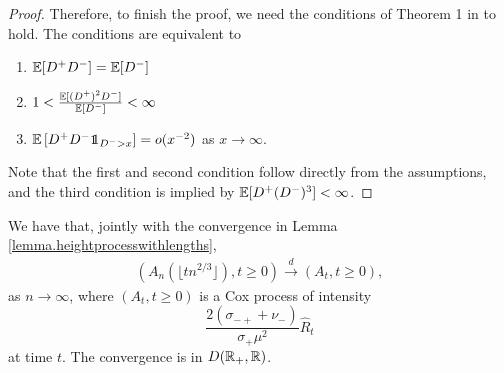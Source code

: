 \begin{proof}
Therefore, to finish the proof, we need the conditions of Theorem 1 in \cite{Deraphelis2017} to hold. The conditions are equivalent to 
\begin{enumerate}
    \item ${\mathbb E}[D^+D^-]={\mathbb E}[D^-]$
    \item $1<\frac{{\mathbb E}[(D^+)^2D^-]}{{\mathbb E}[D^-]}<\infty$
    \item $\E\left[D^+D^-\one_{D^->x}\right]=o(x^{-2})$ as $x\to \infty$. 
\end{enumerate}
Note that the first and second condition follow directly from the assumptions, and the third condition is implied by ${\mathbb E}[D^+(D^-)^3]<\infty$.
\end{proof}



\begin{proposition}\label{prop.convergenceancestraledges}
We have that, jointly with the convergence in Lemma \ref{lemma.heightprocesswithlengths},
\begin{align*}\left(A_n\left(\lfloor tn^{2/3}\rfloor\right),t\geq 0\right)\overset{d}{\to}\left(A_t,t\geq 0\right),\end{align*}
as $n\to \infty$, where $(A_t,t\geq 0)$ is a Cox process of intensity $$\frac{2(\sigma_{-+}+\nu_-)}{\sigma_+\mu^2} \hat{R}_t$$ at time $t$. The convergence is in $D({\mathbb R}_+,{\mathbb R})$.
\end{proposition}


